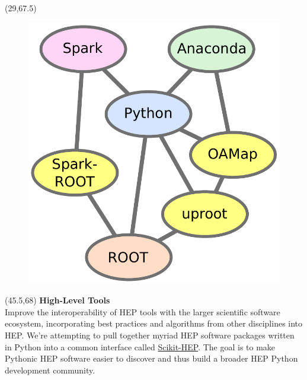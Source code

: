 \documentclass[final]{beamer}
\begin{document}
\begin{frame}{}
\begin{textblock}{12.5}(29,67.5)
\begin{figure}[tbph]
\centering
\includegraphics[width=\textwidth]{images/new_relationship.pdf}
\end{figure}
\end{textblock}


\begin{textblock}{23}(45.5,68)
\textcolor{mybluelabel}{\bf High-Level Tools} \\
Improve the interoperability of HEP tools with the larger scientific software ecosystem, incorporating best practices and algorithms from other disciplines into HEP.
We're attempting to pull together myriad HEP software packages written in Python into a common interface called \href{http://scikit-hep.org/}{Scikit-HEP}.
The goal is to make Pythonic HEP software easier to discover and thus build a broader HEP Python development community.
\end{textblock}


\end{frame}
\end{document}
